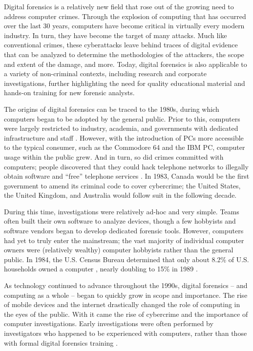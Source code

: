 \documentclass[letterpaper,12pt]{report}
\begin{document}
Digital forensics is a relatively new field that rose out of the growing
need to address computer crimes. Through the explosion of computing that
has occurred over the last 30 years, computers have become critical in
virtually every modern industry. In turn, they have become the target of
many attacks. Much like conventional crimes, these cyberattacks leave
behind traces of digital evidence that can be analyzed to determine the
methodologies of the attackers, the scope and extent of the damage, and
more. Today, digital forensics is also applicable to a variety of
non-criminal contexts, including research and corporate investigations,
further highlighting the need for quality educational material and
hands-on training for new forensic analysts.

The origins of digital forensics can be traced to the 1980s, during
which computers began to be adopted by the general public. Prior to
this, computers were largely restricted to industry, academia, and
governments with dedicated infrastructure and staff
\cite{pollittHistoryDigitalForensics2010}. However, with the
introduction of PCs more accessible to the typical consumer, such as the
Commodore 64 and the IBM PC, computer usage within the public grew. And
in turn, so did crimes committed with computers; people discovered that
they could hack telephone networks to illegally obtain software and
``free'' telephone services \cite{jonesInsightDigitalForensics2022}.
In 1983, Canada would be the first government to amend its criminal code
to cover cybercrime; the United States, the United Kingdom, and
Australia would follow suit in the following decade.

During this time, investigations were relatively ad-hoc and very simple.
Teams often built their own software to analyze devices, though a few
hobbyists and software vendors began to develop dedicated forensic
tools. However, computers had yet to truly enter the mainstream; the
vast majority of individual computer owners were (relatively wealthy)
computer hobbyists rather than the general public. In 1984, the U.S.
Census Bureau determined that only about 8.2\% of U.S. households owned
a computer \cite{robertkominskiComputerUseUnited1988}, nearly
doubling to 15\% in 1989 \cite{robertkominskiComputerUseUnited1991}.

As technology continued to advance throughout the 1990s, digital
forensics -- and computing as a whole -- began to quickly grow in scope
and importance. The rise of mobile devices and the internet drastically
changed the role of computing in the eyes of the public. With it came
the rise of cybercrime and the importance of computer investigations.
Early investigations were often performed by investigators who happened
to be experienced with computers, rather than those with formal digital
forensics training \cite{hargreavesDigitalForensicsEducation2017}.
\end{document}
